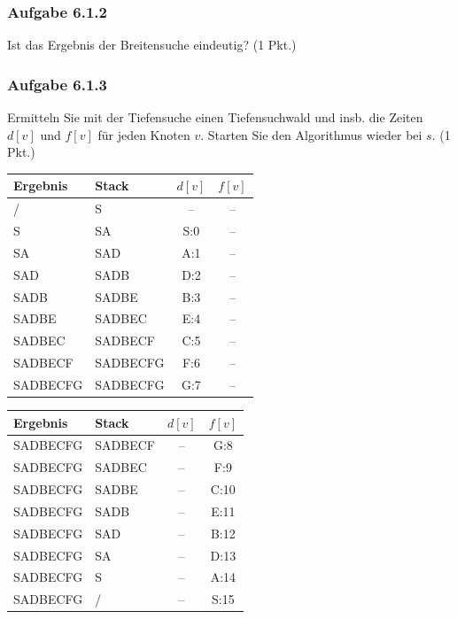 \documentclass{article}
\begin{document}
\subsubsection*{Aufgabe 6.1.2}
\label{sssec:6.1.2}
Ist das Ergebnis der Breitensuche eindeutig? (1 Pkt.)
\vspace{1cm}\-\\

\subsubsection*{Aufgabe 6.1.3}
\label{sssec:6.1.3}
Ermitteln Sie mit der Tiefensuche einen Tiefensuchwald und insb. die Zeiten $d[v]$ und $f[v]$ für jeden Knoten $v$.
Starten Sie den Algorithmus wieder bei $s$. (1 Pkt.)
\vspace{1cm}\-\\
\begin{minipage}[t]{0.42\textwidth}
\begin{tabular}{l|l||c|c}
\textbf{Ergebnis}	&	\textbf{Stack}	&	$d[v]$	&	$f[v]$	\\ \hline
/			&	S			&	--	&	--	\\
S			&	SA			&	S:0	&	--	\\
SA			&	SAD			&	A:1	&	--	\\
SAD			&	SADB		&	D:2	&	--	\\
SADB		&	SADBE		&	B:3	&	--	\\
SADBE		&	SADBEC		&	E:4	&	--	\\
SADBEC		&	SADBECF		&	C:5	&	--	\\
SADBECF		&	SADBECFG	&	F:6	&	--	\\
SADBECFG	&	SADBECFG	&	G:7	&	--	
\end{tabular}
\end{minipage}
\begin{minipage}[t]{0.42\textwidth}
\begin{tabular}{l|l||c|c}
\textbf{Ergebnis}	&	\textbf{Stack}	&	$d[v]$	&	$f[v]$	\\ \hline
SADBECFG	&	SADBECF	&	--	&	G:8		\\
SADBECFG	&	SADBEC	&	--	&	F:9		\\
SADBECFG	&	SADBE	&	--	&	C:10	\\
SADBECFG	&	SADB	&	--	&	E:11	\\
SADBECFG	&	SAD		&	--	&	B:12	\\
SADBECFG	&	SA		&	--	&	D:13	\\
SADBECFG	&	S		&	--	&	A:14	\\
SADBECFG	&	/		&	--	&	S:15	
\end{tabular}
\end{minipage}
\end{document}
